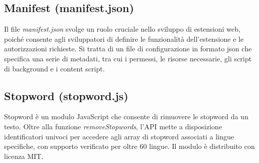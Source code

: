 \subsection*{Manifest (manifest.json)}

\par Il file \textit{manifest.json} svolge un ruolo cruciale nello sviluppo di estensioni web, poiché consente agli sviluppatori di definire le funzionalità dell’estensione e le autorizzazioni richieste. Si tratta di un file di configurazione in formato \gls{json} che specifica una serie di metadati, tra cui i permessi, le risorse necessarie, gli script di background e i content script.

\subsection*{Stopword (stopword.js)}

\par Stopword è un modulo JavaScript che consente di rimuovere le \gls{stopword} da un testo. Oltre alla funzione \textit{removeStopwords}, l’API mette a disposizione identificatori univoci per accedere agli array di stopword associati a lingue specifiche, con supporto verificato per oltre 60 lingue. Il modulo è distribuito con licenza MIT.